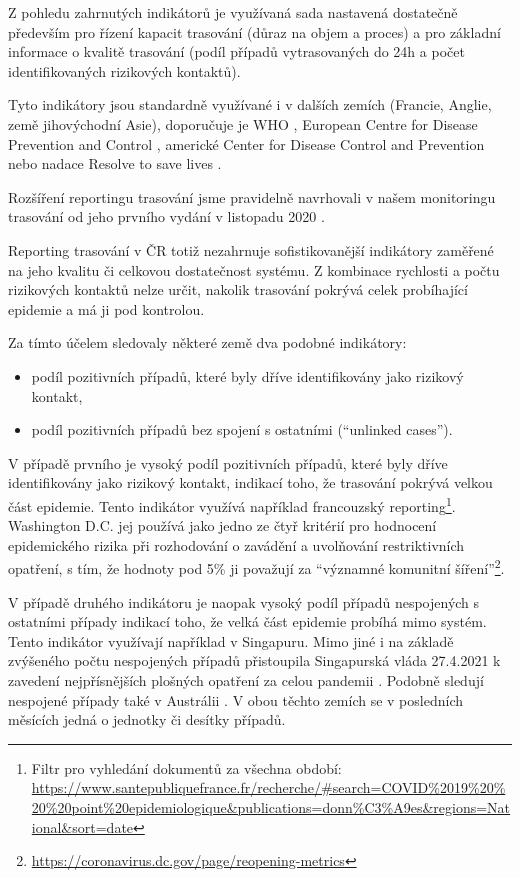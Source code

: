 Z pohledu zahrnutých indikátorů je využívaná sada nastavená dostatečně především pro řízení kapacit trasování (důraz na objem a proces) a pro základní informace o kvalitě trasování (podíl případů vytrasovaných do 24h a počet identifikovaných rizikových kontaktů).

Tyto indikátory jsou standardně využívané i v dalších zemích (Francie, Anglie, země jihovýchodní Asie), doporučuje je WHO \cite{tr_WHO_2021}, European Centre for Disease Prevention and Control \cite{tr_ECDC_2020} , americké Center for Disease Control and Prevention \cite{tr_CDC_2020} nebo nadace Resolve to save lives \cite{tr_contact_tracing}.

Rozšíření reportingu trasování jsme pravidelně navrhovali v našem monitoringu trasování od jeho prvního vydání v listopadu 2020 \cite{tr_bisop07}.

Reporting trasování v ČR totiž nezahrnuje sofistikovanější indikátory zaměřené na jeho kvalitu či celkovou dostatečnost systému. Z kombinace rychlosti a počtu rizikových kontaktů nelze určit, nakolik trasování pokrývá celek probíhající epidemie a má ji pod kontrolou.

Za tímto účelem sledovaly některé země dva podobné indikátory:
\begin{itemize}
\item podíl pozitivních případů, které byly dříve identifikovány jako rizikový kontakt,
\item podíl pozitivních případů bez spojení s ostatními (“unlinked cases”).
\end{itemize}

V případě prvního je vysoký podíl pozitivních případů, které byly dříve identifikovány jako rizikový kontakt, indikací toho, že trasování pokrývá velkou část epidemie. Tento indikátor využívá například francouzský reporting\footnote{Filtr pro vyhledání dokumentů za všechna období: \url{https://www.santepubliquefrance.fr/recherche/\#search=COVID\%2019\%20\%20\%20point\%20epidemiologique&publications=donn\%C3\%A9es&regions=National&sort=date}}. Washington D.C. jej používá jako jedno ze čtyř kritérií pro hodnocení epidemického rizika při rozhodování o zavádění a uvolňování restriktivních opatření, s tím, že hodnoty pod 5\% ji považují za “významné komunitní šíření”\footnote{\url{https://coronavirus.dc.gov/page/reopening-metrics}}.


V případě druhého indikátoru je naopak vysoký podíl případů nespojených s ostatními případy indikací toho, že velká část epidemie probíhá mimo systém. Tento indikátor využívají například v Singapuru. Mimo jiné i na základě zvýšeného počtu nespojených případů přistoupila Singapurská vláda 27.4.2021 k zavedení nejpřísnějších plošných opatření za celou pandemii \cite{tr_Singapour}. Podobně sledují nespojené případy také v Austrálii \cite{tr_australie}. V obou těchto zemích se v posledních měsících jedná o jednotky či desítky případů.

